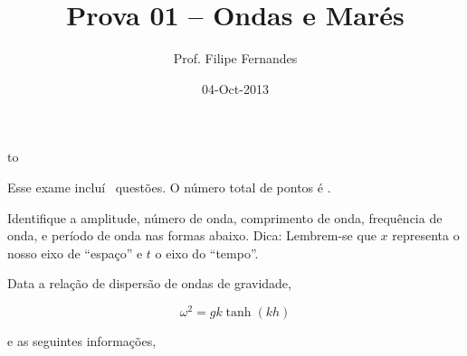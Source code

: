 \documentclass[letterpaper,portuguese,12pt,pdftex]{exam}
\title{Prova 01 -- Ondas e Marés}
\author{Prof. Filipe Fernandes}
\date{04-Oct-2013}
\begin{document}
\maketitle
\doublespacing

\vspace{1cm}
\hbox to \textwidth{Nome e número de matrícula:\enspace\hrulefill}
\vspace{1cm}

\begin{minipage}{.8\textwidth}
Esse exame incluí \numquestions\ questões. O número total de pontos é \numpoints.
\end{minipage}

\begin{questions}
\question
Identifique a amplitude, número de onda, comprimento de onda, frequência de onda,
e período de onda nas formas abaixo.  Dica: Lembrem-se que $x$ representa o
nosso eixo de ``espaço'' e $t$ o eixo do ``tempo''.



\question
Data a relação de dispersão de ondas de gravidade,

$$\omega^2 = gk\tanh(kh)$$

e as seguintes informações,


\end{questions}
\end{document}
